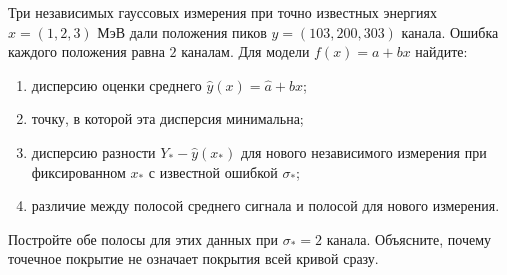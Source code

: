 \documentclass[
  russian,
  11pt,
  a4paper,
  open=any]{scrbook}
\providecommand{\tightlist}{%
  \setlength{\itemsep}{0pt}\setlength{\parskip}{0pt}}
\begin{document}
\begin{semanticpdfbox}[colback=BookCoralSoft,borderline west={1.2mm}{0pt}{BookCoral}]

\par\nopagebreak[4]\vspace{1.2mm}

Три независимых гауссовых измерения при точно известных энергиях
\(x=(1,2,3)\) МэВ дали положения пиков \(y=(103,200,303)\) канала.
Ошибка каждого положения равна \(2\) каналам. Для модели \(f(x)=a+bx\)
найдите:

\begin{enumerate}
\def\labelenumi{\arabic{enumi}.}
\tightlist
\item
  дисперсию оценки среднего \(\widehat y(x)=\widehat a+\widehat bx\);
\item
  точку, в которой эта дисперсия минимальна;
\item
  дисперсию разности \(Y_*-\widehat y(x_*)\) для нового независимого
  измерения при фиксированном \(x_*\) с известной ошибкой \(\sigma_*\);
\item
  различие между полосой среднего сигнала и полосой для нового
  измерения.
\end{enumerate}

Постройте обе полосы для этих данных при \(\sigma_*=2\) канала.
Объясните, почему точечное покрытие не означает покрытия всей кривой
сразу.

\end{semanticpdfbox}
\end{document}
